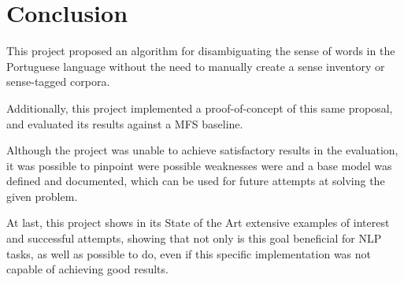 \chapter{Conclusion}
\label{ch:conclusion}

This project proposed an algorithm for disambiguating the sense of words in the
Portuguese language without the need to manually create a sense inventory or
sense-tagged corpora.

Additionally, this project implemented a proof-of-concept of this same proposal,
and evaluated its results against a \ac{MFS} baseline.

Although the project was unable to achieve satisfactory results in the
evaluation, it was possible to pinpoint were possible weaknesses were and a base
model was defined and documented, which can be used for future attempts at
solving the given problem.

At last, this project shows in its State of the Art extensive examples of
interest and successful attempts, showing that not only is this goal beneficial
for \ac{NLP} tasks, as well as possible to do, even if this specific
implementation was not capable of achieving good results.

